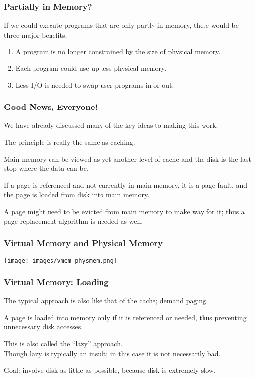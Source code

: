 \begin{frame}
\frametitle{Partially in Memory?}

If we could execute programs that are only partly in memory, there would be three major benefits:

\begin{enumerate}
	\item A program is no longer constrained by the size of physical memory.
	\item Each program could use up less physical memory.
	\item Less I/O is needed to swap user programs in or out.
\end{enumerate}

\end{frame}

\begin{frame}
\frametitle{Good News, Everyone!}

We have already discussed many of the key ideas to making this work. 

The principle is really the same as caching. 

Main memory can be viewed as yet another level of cache and the disk is the last stop where the data can be. 

If a page is referenced and not currently in main memory, it is a page fault, and the page is loaded from disk into main memory. 

A page might need to be evicted from main memory to make way for it; thus a page replacement algorithm is needed as well.

\end{frame}

\begin{frame}
\frametitle{Virtual Memory and Physical Memory}

\begin{center}
\texttt{[image: images/vmem-physmem.png]}
\end{center}

\end{frame}

\begin{frame}
\frametitle{Virtual Memory: Loading}

The typical approach is also like that of the cache; demand paging. 

A page is loaded into memory only if it is referenced or needed, thus preventing unnecessary disk accesses. 

This is also called the ``lazy'' approach.\\
\quad Though lazy is typically an insult; in this case it is not necessarily bad.  

Goal: involve disk as little as possible, because disk is extremely slow.


\end{frame}


